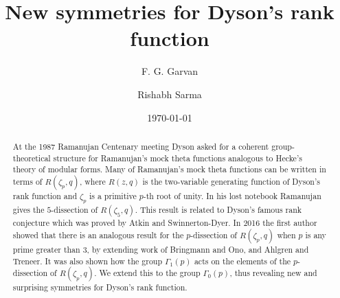 \documentclass[12pt]{amsart}
\theoremstyle{definition}
\theoremstyle{remark}
\numberwithin{equation}{section}
\begin{document}
\newcommand{\beqs}{\begin{equation*}}
\newcommand{\eeqs}{\end{equation*}}
\newcommand{\beq}{\begin{equation}}
\newcommand{\eeq}{\end{equation}}
\renewcommand{\MR}[1]{\href{http://www.ams.org/mathscinet-getitem?mr={#1}}{MR{#1}}}
\title[Dyson rank function symmetries]
{New symmetries for Dyson's rank function}

\author{F. G. Garvan}
\address{Department of Mathematics, University of Florida, Gainesville,
FL 32611-8105}
\author{Rishabh Sarma}
\address{Department of Mathematics, University of Florida, Gainesville,
FL 32611-8105}



\date{\today}                   


%

\begin{abstract}
At the 1987 Ramanujan Centenary meeting Dyson asked for a coherent 
group-theoretical structure for Ramanujan's mock theta functions 
analogous to Hecke's theory of modular forms.  Many of Ramanujan's mock theta functions can be written in terms of $R(\zeta_p,q)$, where $R(z,q)$ is  the two-variable generating function of Dyson's rank function and  $\zeta_p$ is a primitive $p$-th root of unity. 
In his lost notebook Ramanujan gives the $5$-dissection of $R(\zeta_5,q)$. This result is related to Dyson's famous rank conjecture which was proved by Atkin and Swinnerton-Dyer. In 2016 the first author showed that there is an analogous result for the $p$-dissection of $R(\zeta_p,q)$ when $p$ is any prime greater than $3$, by extending work of Bringmann and Ono, and Ahlgren and Treneer. It was also shown how the group $\Gamma_1(p)$ acts on the elements of the $p$-dissection of $R(\zeta_p,q)$. We extend this to the group $\Gamma_0(p)$, thus revealing new and surprising symmetries for Dyson's rank function.
\end{abstract}
\end{document}
